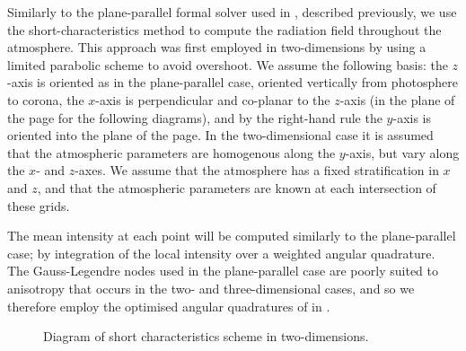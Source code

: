 Similarly to the plane-parallel formal solver used in \Lw{}, described previously, we use the short-characteristics method to compute the radiation field throughout the atmosphere.
This approach was first employed in two-dimensions by \citet{Auer1994} using a limited parabolic scheme to avoid overshoot.
We assume the following basis: the $z$-axis is oriented as in the plane-parallel case, oriented vertically from photosphere to corona, the $x$-axis is perpendicular and co-planar to the $z$-axis (in the plane of the page for the following diagrams), and by the right-hand rule the $y$-axis is oriented into the plane of the page.
In the two-dimensional case it is assumed that the atmospheric parameters are homogenous along the $y$-axis, but vary along the $x$- and $z$-axes.
We assume that the atmosphere has a fixed stratification in $x$ and $z$, and that the atmospheric parameters are known at each intersection of these grids.

The mean intensity at each point will be computed similarly to the plane-parallel case; by integration of the local intensity over a weighted angular quadrature.
The Gauss-Legendre nodes used in the plane-parallel case are poorly suited to anisotropy that occurs in the two- and three-dimensional cases, and so we therefore employ the optimised angular quadratures of \citet{Stepan2020} in \Lw{}.

\begin{figure}
\centering
{}
\caption{Diagram of short characteristics scheme in two-dimensions.}
\label{Fig:Sc2d}
\end{figure}

